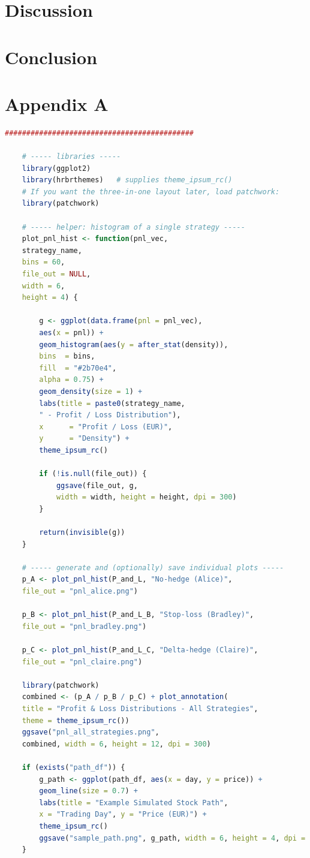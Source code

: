 \documentclass[11pt,a4paper]{article}
\begin{document}
	\section{Discussion}
	
	\section{Conclusion}
	
	\appendix
	\section{Appendix A}
\begin{lstlisting}[language=R, caption={R code used for generating Figures 1,2,3, and 4}]
	############################################
	
	# ----- libraries -----
	library(ggplot2)
	library(hrbrthemes)   # supplies theme_ipsum_rc()
	# If you want the three-in-one layout later, load patchwork:
	library(patchwork)
	
	# ----- helper: histogram of a single strategy -----
	plot_pnl_hist <- function(pnl_vec,
	strategy_name,
	bins = 60,
	file_out = NULL,
	width = 6,
	height = 4) {
		
		g <- ggplot(data.frame(pnl = pnl_vec),
		aes(x = pnl)) +
		geom_histogram(aes(y = after_stat(density)),
		bins  = bins,
		fill  = "#2b70e4",
		alpha = 0.75) +
		geom_density(size = 1) +
		labs(title = paste0(strategy_name,
		" - Profit / Loss Distribution"),
		x      = "Profit / Loss (EUR)",
		y      = "Density") +
		theme_ipsum_rc()
		
		if (!is.null(file_out)) {
			ggsave(file_out, g,
			width = width, height = height, dpi = 300)
		}
		
		return(invisible(g))
	}
	
	# ----- generate and (optionally) save individual plots -----
	p_A <- plot_pnl_hist(P_and_L, "No-hedge (Alice)",
	file_out = "pnl_alice.png")
	
	p_B <- plot_pnl_hist(P_and_L_B, "Stop-loss (Bradley)",
	file_out = "pnl_bradley.png")
	
	p_C <- plot_pnl_hist(P_and_L_C, "Delta-hedge (Claire)",
	file_out = "pnl_claire.png")
	
	library(patchwork)
	combined <- (p_A / p_B / p_C) + plot_annotation(
	title = "Profit & Loss Distributions - All Strategies",
	theme = theme_ipsum_rc())
	ggsave("pnl_all_strategies.png",
	combined, width = 6, height = 12, dpi = 300)
	
	if (exists("path_df")) {
		g_path <- ggplot(path_df, aes(x = day, y = price)) +
		geom_line(size = 0.7) +
		labs(title = "Example Simulated Stock Path",
		x = "Trading Day", y = "Price (EUR)") +
		theme_ipsum_rc()
		ggsave("sample_path.png", g_path, width = 6, height = 4, dpi = 300)
	}
\end{lstlisting}

	
\end{document}
